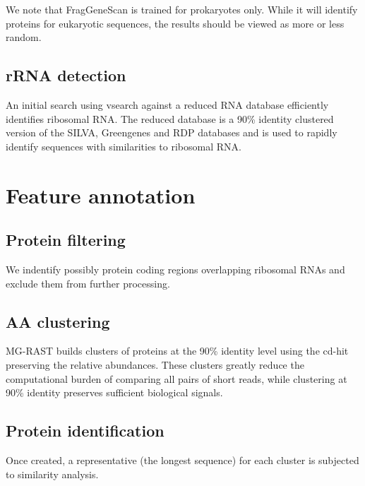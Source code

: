 \documentclass[12pt,fullpage]{report}
\begin{document}
We note that FragGeneScan is trained for prokaryotes only. While it will identify proteins for eukaryotic sequences, the results should be viewed as more or less random.

\subsection*{rRNA detection}
An initial search using vsearch \cite{VSEARCH} against a reduced RNA database efficiently identifies ribosomal RNA. The reduced database is a 90\% identity clustered version of the SILVA, Greengenes and RDP databases and is used to rapidly identify sequences with similarities to ribosomal RNA.




\section{Feature annotation}

\subsection{Protein filtering}
We indentify possibly protein coding regions overlapping ribosomal RNAs and exclude them from further processing.

\subsection*{AA clustering}
MG-RAST builds clusters of proteins at the 90\% identity level using the cd-hit \cite{cd-hit} preserving the relative abundances. These clusters greatly reduce the computational burden of comparing all pairs of short reads, while clustering at 90\% identity preserves sufficient biological signals.




\subsection*{Protein identification}
Once created, a representative (the longest sequence) for each cluster is subjected to similarity analysis.
\end{document}
